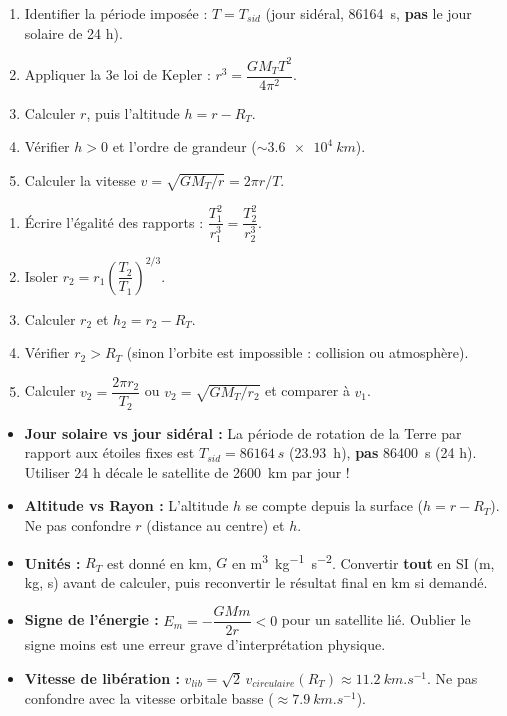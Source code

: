 \documentclass[11pt]{article}
\begin{document}
\begin{methode}
\begin{enumerate}
\item Identifier la période imposée : $T = T_{sid}$ (jour sidéral, \SI{86164}{s}, \textbf{pas} le jour solaire de 24 h).
\item Appliquer la 3e loi de Kepler : $r^3 = \dfrac{G M_T T^2}{4\pi^2}$.
\item Calculer $r$, puis l'altitude $h = r - R_T$.
\item Vérifier $h > 0$ et l'ordre de grandeur ($\sim \SI{3,6e4}{km}$).
\item Calculer la vitesse $v = \sqrt{GM_T/r} = 2\pi r/T$.
\end{enumerate}
\end{methode}

\begin{methode}
\begin{enumerate}
\item Écrire l'égalité des rapports : $\dfrac{T_1^2}{r_1^3} = \dfrac{T_2^2}{r_2^3}$.
\item Isoler $r_2 = r_1 \left(\dfrac{T_2}{T_1}\right)^{2/3}$.
\item Calculer $r_2$ et $h_2 = r_2 - R_T$.
\item Vérifier $r_2 > R_T$ (sinon l'orbite est impossible : collision ou atmosphère).
\item Calculer $v_2 = \dfrac{2\pi r_2}{T_2}$ ou $v_2 = \sqrt{GM_T/r_2}$ et comparer à $v_1$.
\end{enumerate}
\end{methode}

\begin{attention}
\begin{itemize}
\item \textbf{Jour solaire vs jour sidéral :} La période de rotation de la Terre par rapport aux étoiles fixes est $T_{sid} = \SI{86164}{s}$ (\SI{23,93}{h}), \textbf{pas} \SI{86400}{s} (24 h). Utiliser 24 h décale le satellite de \SI{2600}{km} par jour !
\item \textbf{Altitude vs Rayon :} L'altitude $h$ se compte depuis la surface ($h = r - R_T$). Ne pas confondre $r$ (distance au centre) et $h$.
\item \textbf{Unités :} $R_T$ est donné en \si{km}, $G$ en \si{m^3.kg^{-1}.s^{-2}}. Convertir \textbf{tout} en SI (m, kg, s) avant de calculer, puis reconvertir le résultat final en \si{km} si demandé.
\item \textbf{Signe de l'énergie :} $E_m = -\dfrac{GMm}{2r} < 0$ pour un satellite lié. Oublier le signe moins est une erreur grave d'interprétation physique.
\item \textbf{Vitesse de libération :} $v_{lib} = \sqrt{2}\,v_{circulaire}(R_T) \approx \SI{11,2}{km.s^{-1}}$. Ne pas confondre avec la vitesse orbitale basse ($\approx \SI{7,9}{km.s^{-1}}$).
\end{itemize}
\end{attention}
\end{document}
